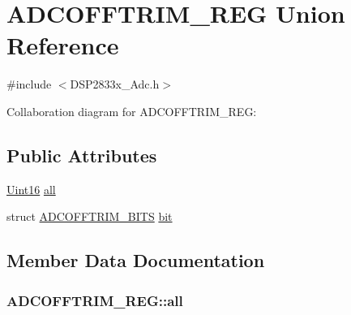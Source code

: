 \hypertarget{union_a_d_c_o_f_f_t_r_i_m___r_e_g}{}\section{A\+D\+C\+O\+F\+F\+T\+R\+I\+M\+\_\+\+R\+E\+G Union Reference}
\label{union_a_d_c_o_f_f_t_r_i_m___r_e_g}


{\ttfamily \#include $<$D\+S\+P2833x\+\_\+\+Adc.\+h$>$}



Collaboration diagram for A\+D\+C\+O\+F\+F\+T\+R\+I\+M\+\_\+\+R\+E\+G\+:
\subsection*{Public Attributes}
\begin{DoxyCompactItemize}
\item 
\hyperlink{_d_s_p2833x___device_8h_a59a9f6be4562c327cbfb4f7e8e18f08b}{Uint16} \hyperlink{union_a_d_c_o_f_f_t_r_i_m___r_e_g_ae8b09f6807d5f0bc7a41a0dc797f894e}{all}
\item 
struct \hyperlink{struct_a_d_c_o_f_f_t_r_i_m___b_i_t_s}{A\+D\+C\+O\+F\+F\+T\+R\+I\+M\+\_\+\+B\+I\+T\+S} \hyperlink{union_a_d_c_o_f_f_t_r_i_m___r_e_g_a7dac1b351eb7aa366e12f1ef3ab2ec6d}{bit}
\end{DoxyCompactItemize}


\subsection{Member Data Documentation}
\hypertarget{union_a_d_c_o_f_f_t_r_i_m___r_e_g_ae8b09f6807d5f0bc7a41a0dc797f894e}{}
\subsubsection[{all}]{ A\+D\+C\+O\+F\+F\+T\+R\+I\+M\+\_\+\+R\+E\+G\+::all}\label{union_a_d_c_o_f_f_t_r_i_m___r_e_g_ae8b09f6807d5f0bc7a41a0dc797f894e}
\hypertarget{union_a_d_c_o_f_f_t_r_i_m___r_e_g_a7dac1b351eb7aa366e12f1ef3ab2ec6d}{}
